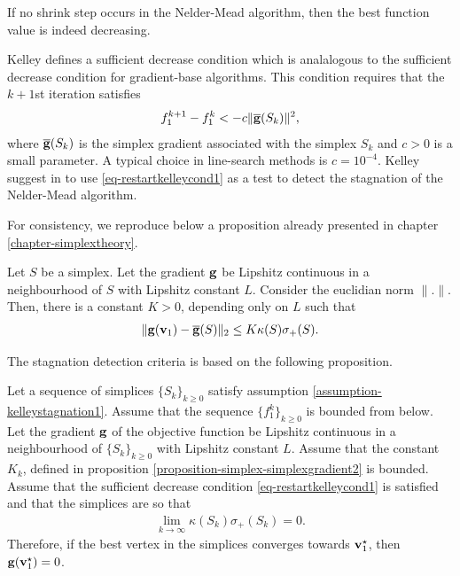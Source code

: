 If no shrink step occurs in the Nelder-Mead algorithm, then the best function value
is indeed decreasing. 

Kelley defines a sufficient decrease condition which is analalogous to the 
sufficient decrease condition for gradient-base algorithms.
This condition requires that the $k+1$st iteration satisfies 
\begin{eqnarray}
\label{eq-restartkelleycond1}
f_1^{k+1} - f_1^k < - c \| \overline{\mathbf{g}}(S_k) \|^2,
\end{eqnarray}
where $\overline{\mathbf{g}}(S_k)$ is the simplex gradient associated with the 
simplex $S_k$ and $c>0$ is a small parameter. 
A typical choice in line-search methods is $c = 10^{-4}$. 
Kelley suggest in \cite{589283} to use \ref{eq-restartkelleycond1} as a 
test to detect the stagnation of the Nelder-Mead algorithm. 

For consistency, we reproduce below a proposition already presented 
in chapter \ref{chapter-simplextheory}.

\begin{proposition}
\label{proposition-simplex-simplexgradient2}
Let $S$ be a simplex. Let the gradient $\mathbf{g}$ be Lipshitz continuous in a neighbourhood
of $S$ with Lipshitz constant $L$. Consider the euclidian norm $\|.\|$. Then, there is a constant $K>0$,
depending only on $L$ such that 
\begin{eqnarray}
\label{eq-inequality-simplexgradient2}
\| \mathbf{g}(\mathbf{v}_1) - \overline{\mathbf{g}}(S) \|_2 \leq K \kappa(S) \sigma_+(S).
\end{eqnarray}
\end{proposition}

The stagnation detection criteria is based on the following proposition.

\begin{proposition}
\label{proposition-kelley-gradientconverge}
Let a sequence of simplices $\{S_k\}_{k\geq 0}$ satisfy assumption \ref{assumption-kelleystagnation1}.
Assume that the sequence $\{f_1^k\}_{k\geq 0}$ is bounded from below. 
Let the gradient $\mathbf{g}$ of the objective function 
be Lipshitz continuous in a neighbourhood of $\{S_k\}_{k\geq 0}$ with Lipshitz constant $L$. 
Assume that the constant $K_k$, defined in proposition \ref{proposition-simplex-simplexgradient2}
is bounded. Assume that the sufficient decrease condition \ref{eq-restartkelleycond1} is satisfied and 
that the simplices are so that 
\begin{eqnarray}
\label{eq-restartkelleyassumption1}
\lim_{k \rightarrow \infty} \kappa(S_k) \sigma_+(S_k) = 0.
\end{eqnarray}
Therefore, if the best vertex in the simplices converges towards $\mathbf{v}_1^\star$, 
then $\mathbf{g}(\mathbf{v}_1^\star)=0$.
\end{proposition}

